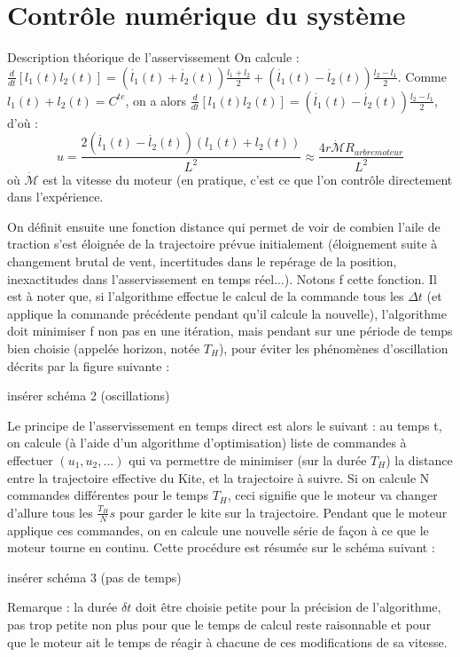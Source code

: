 \documentclass[a4paper,twoside,12pt]{article}
\newcounter{partie}
\newcounter{sous-partie}
\newenvironment{partie}[1]
{
\section{#1}
}
{

}
\newenvironment{sous-partie}[1]
{
\subsection{#1}
}
{

}
\begin{document}
\begin{partie}{Contrôle numérique du système}
\begin{sous-partie}{Description théorique de l'asservissement}
On calcule : $\frac{d}{dt}[l_1(t) l_2(t)] = (\dot{l_1}(t)+ \dot{l_2}(t))\frac{l_1 + l_2}{2}+(\dot{l_1}(t)- \dot{l_2}(t))\frac{l_2 - l_1}{2}$. %
Comme $l_1(t)+l_2(t)=C^{te}$, on a alors $\frac{d}{dt}[l_1(t) l_2(t)]= (\dot{l_1}(t)- \dot{l_2}(t))\frac{l_2 - l_1}{2}$, d'où :
$$u =  \frac{2 (\dot{l_1}(t)-\dot{l_2}(t))(l_1(t)+l_2(t))}{L^2} \approx \frac{4 r \dot{\mathcal{M}} R_{arbre moteur}}{L^2}$$ où $\dot{\mathcal{M}}$ est la vitesse du moteur (en pratique, c'est ce que l'on contrôle directement dans l'expérience.



On définit ensuite une fonction distance qui permet de voir de combien l'aile de traction s'est éloignée de la trajectoire prévue initialement (éloignement suite à changement brutal de vent, incertitudes dans le repérage de la position, inexactitudes dans l'asservissement en temps réel...). %
Notons f cette fonction. %
Il est à noter que, si l'algorithme effectue le calcul de la commande tous les $\Delta t$ (et applique la commande précédente pendant qu'il calcule la nouvelle), l'algorithme doit minimiser f non pas en une itération, mais pendant sur  une période de temps bien choisie (appelée horizon, notée $T_H$), pour éviter les phénomènes d'oscillation décrits par la figure suivante : 
\newline
\begin{Huge}
insérer schéma 2 (oscillations)
\end{Huge}
\newline
Le principe de l'asservissement en temps direct est alors le suivant : au temps t, on calcule (à l'aide d'un algorithme d'optimisation) liste de commandes à effectuer $(u_1,u_2,...)$ qui va permettre de minimiser (sur la durée $T_H$) la distance entre la trajectoire effective du Kite, et la trajectoire à suivre. %
Si on calcule N commandes différentes pour le temps $T_H$, ceci signifie que le moteur va changer d'allure tous les $\frac{T_H}{N}s$ pour garder le kite sur la trajectoire. %
Pendant que le moteur applique ces commandes, on en calcule une nouvelle série de façon à ce que le moteur tourne en continu. %
Cette procédure est résumée sur le schéma suivant : 
\newline
\begin{huge}
insérer schéma 3 (pas de temps)
\end{huge}
Remarque : la durée $\delta t$ doit être choisie petite pour la précision de l'algorithme, pas trop petite non plus pour que le temps de calcul reste raisonnable et pour que le moteur ait le temps de réagir à chacune de ces modifications de sa vitesse.
\end{sous-partie}


\end{partie}
\end{document}
